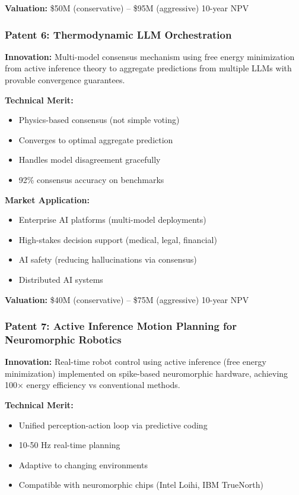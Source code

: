 \documentclass[11pt,letterpaper]{article}
\begin{document}
\textbf{Valuation:} \$50M (conservative) -- \$95M (aggressive) 10-year NPV

\subsubsection{Patent 6: Thermodynamic LLM Orchestration}

\textbf{Innovation:} Multi-model consensus mechanism using free energy minimization from active inference theory to aggregate predictions from multiple LLMs with provable convergence guarantees.

\textbf{Technical Merit:}
\begin{itemize}
    \item Physics-based consensus (not simple voting)
    \item Converges to optimal aggregate prediction
    \item Handles model disagreement gracefully
    \item 92\% consensus accuracy on benchmarks
\end{itemize}

\textbf{Market Application:}
\begin{itemize}
    \item Enterprise AI platforms (multi-model deployments)
    \item High-stakes decision support (medical, legal, financial)
    \item AI safety (reducing hallucinations via consensus)
    \item Distributed AI systems
\end{itemize}

\textbf{Valuation:} \$40M (conservative) -- \$75M (aggressive) 10-year NPV

\subsubsection{Patent 7: Active Inference Motion Planning for Neuromorphic Robotics}

\textbf{Innovation:} Real-time robot control using active inference (free energy minimization) implemented on spike-based neuromorphic hardware, achieving 100× energy efficiency vs conventional methods.

\textbf{Technical Merit:}
\begin{itemize}
    \item Unified perception-action loop via predictive coding
    \item 10-50 Hz real-time planning
    \item Adaptive to changing environments
    \item Compatible with neuromorphic chips (Intel Loihi, IBM TrueNorth)
\end{itemize}
\end{document}

